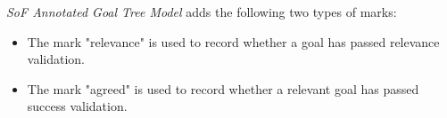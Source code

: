 \documentclass{beamer}
\begin{document}
\begin{frame}{\emph{SoF Annotated Goal Tree Model} adds the following two types of marks:}            
  \begin{itemize}
  \item
    The mark "relevance" is used to record whether a goal has passed relevance validation.\pause
  \item
    The mark "agreed" is used to record whether a relevant goal has passed success validation.\pause
  \end{itemize}
\end{frame}


\end{document}
